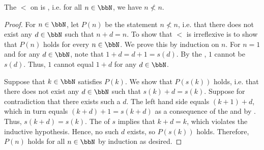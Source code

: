 \begin{lemma} \label{lemma:standard_order_on_natural_numbers_is_irreflexive}
    The  $<$ on  is , i.e. for all $n \in \bbN$, we have $n \not< n$.
\end{lemma}
\begin{proof}
    For $n \in \bbN$, let $P(n)$ be the statement $n \not< n$, i.e. that there does not exist any $d \in \bbN$ such that $n+d = n$. To show that $<$ is irreflexive is to show that $P(n)$ holds for every $n \in \bbN$. We prove this by induction on $n$. For $n = 1$ and for any $d \in \bbN$, note that $1+d = d+1 = s(d)$. By the , $1$ cannot be $s(d)$. Thus, $1$ cannot equal $1+d$ for any $d \in \bbN$. 

    Suppose that $k \in \bbN$ satisfies $P(k)$. We show that $P(s(k))$ holds, i.e. that there does not exist any $d \in \bbN$ such that $s(k)+d = s(k)$. Suppose for contradiction that there exists such a $d$. The left hand side equals $(k+1)+d$, which in turn equals $(k+d)+1 = s(k+d)$ as a consequence of the  and by . Thus, $s(k+d) = s(k)$. The  of $s$ implies that $k+d = k$, which violates the inductive hypothesis. Hence, no such $d$ exists, so $P(s(k))$ holds. Therefore, $P(n)$ holds for all $n \in \bbN$ by induction as desired.
\end{proof}